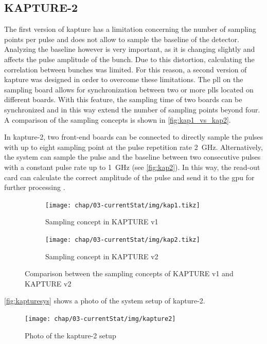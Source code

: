 \subsection{KAPTURE-2}
The first version of \gls{kapture} has a limitation concerning the number of sampling points per pulse and does not allow to sample the baseline of the detector.
Analyzing the baseline however is very important, as it is changing slightly and affects the pulse amplitude of the bunch. 
Due to this distortion, calculating the correlation between bunches was limited. 
For this reason, a second version of \gls{kapture} was designed in order to overcome these limitations. 
The \gls{pll} on the sampling board allows for synchronization between two or more \glspl{pll} located on different boards.
With this feature, the sampling time of two boards can be synchronized and in this way extend the number of sampling points beyond four.
A comparison of the sampling concepts is shown in \autoref{fig:kap1_vs_kap2}.

In \gls{kapture}-2, two front-end boards can be connected to directly sample the pulses with up to eight sampling point at the pulse repetition rate \SI{2}{\GHz}. 
Alternatively, the system can sample the pulse and the baseline between two consecutive pulses with a constant pulse rate up to \SI{1}{\GHz} (see \autoref{fig:kap2}).
In this way, the read-out card can calculate the correct amplitude of the pulse and send it to the \gls{gpu} for further processing \cite{caselleKAP}.


\begin{figure}[tbh]
	\centering
	\begin{subfigure}{0.4\textwidth}
		\centering
		\texttt{[image: chap/03-currentStat/img/kap1.tikz]}  
		\caption{Sampling concept in KAPTURE v1}
		\label{fig:kap1}
	\end{subfigure}
	\hfill
	\begin{subfigure}{0.4\textwidth}
		\centering
		\texttt{[image: chap/03-currentStat/img/kap2.tikz]}  
		\caption{Sampling concept in KAPTURE v2}
		\label{fig:kap2}
	\end{subfigure}
	\caption[Comparison between KAPTURE v1 and v2]{Comparison between the sampling concepts of KAPTURE v1 and KAPTURE v2}
	\label{fig:kap1_vs_kap2}
\end{figure}


\autoref{fig:kapturesys} shows a photo of the system setup of \gls{kapture}-2.

\begin{figure}[tbh]
	\centering
	\texttt{[image: chap/03-currentStat/img/kapture2]}
	\caption[Photo of KAPTURE-2 system]{Photo of the \gls{kapture}-2 setup}
	\label{fig:kapturesys}
\end{figure}



